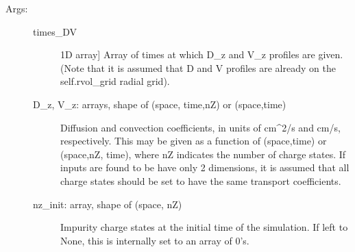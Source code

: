 \documentclass[letterpaper,10pt,english]{sphinxmanual}
\begin{document}
\begin{fulllineitems}
\begin{fulllineitems}
\begin{sphinxVerbatim}[commandchars=\\\{\}]
 
                     
                   \PYG{l+s+s1}{\PYGZdl{}n\PYGZus{}z\PYGZdl{} [cm\PYGZdl{}\PYGZca{}}\PYG{l+s+s1}{\PYGZhy{}3\PYGZcb{}\PYGZdl{}]} 
                   \PYG{p}{[}    \PYG{p}{[}\PYG{p}{]}\PYG{p}{]}
\end{sphinxVerbatim}
\begin{description}
\item[{Args:}] \leavevmode\begin{description}
\item[{times\_DV}] \leavevmode{[}1D array{]}
Array of times at which D\_z and V\_z profiles are given. (Note that it is assumed that
D and V profiles are already on the self.rvol\_grid radial grid).

\item[{D\_z, V\_z: arrays, shape of (space, time,nZ) or (space,time)}] \leavevmode
Diffusion and convection coefficients, in units of cm\textasciicircum{}2/s and cm/s, respectively.
This may be given as a function of (space,time) or (space,nZ, time), where nZ indicates
the number of charge states. If inputs are found to be have only 2 dimensions, it is
assumed that all charge states should be set to have the same transport coefficients.

\item[{nz\_init: array, shape of (space, nZ)}] \leavevmode
Impurity charge states at the initial time of the simulation. If left to None, this is
internally set to an array of 0’s.


\end{description}
\end{description}
\end{fulllineitems}
\end{fulllineitems}
\end{document}
